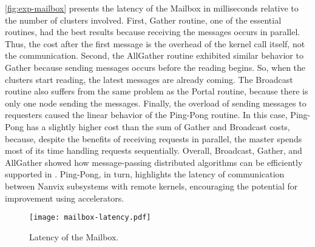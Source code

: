			\autoref{fig:exp-mailbox} presents the latency of the Mailbox in
			milliseconds relative to the number of clusters involved. First,
			Gather routine, one of the essential routines, had the best results
			because receiving the messages occurs in parallel. Thus, the cost
			after the first message is the overhead of the kernel call itself,
			not the communication. Second, the AllGather routine exhibited similar
			behavior to Gather because sending messages occurs before the reading
			begins. So, when the clusters start reading, the latest messages are
			already coming. The Broadcast routine also suffers from the same problem
			as the Portal routine, because there is only one node sending
			the messages. Finally, the overload of sending
			messages to requesters caused the linear behavior of the Ping-Pong
			routine. In this case, Ping-Pong has a slightly higher cost than the
			sum of Gather and Broadcast costs, because, despite the benefits of
			receiving requests in parallel, the master spends most of its time
			handling requests sequentially. Overall, Broadcast, Gather, and
			AllGather showed how message-passing distributed algorithms can be
			efficiently supported in \nanvixmultikernel. Ping-Pong, in turn,
			highlights the latency of communication between Nanvix subsystems
			with remote kernels, encouraging the potential for improvement using
			\dma accelerators.

			\begin{figure}[!tb]
				\centering%
				\caption{Latency of the Mailbox.}%
				\label{fig:exp-mailbox}%
				\texttt{[image: mailbox-latency.pdf]}%
			\end{figure}
